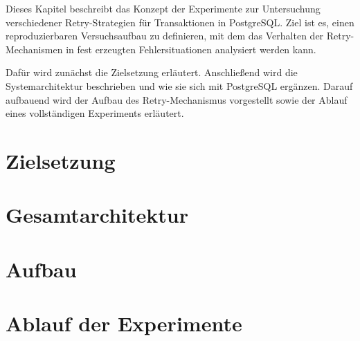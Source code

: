 
Dieses Kapitel beschreibt das Konzept der Experimente zur Untersuchung verschiedener Retry-Strategien für
Transaktionen in PostgreSQL\@.
Ziel ist es, einen reproduzierbaren Versuchsaufbau zu definieren, mit dem das Verhalten der Retry-Mechanismen in
fest erzeugten Fehlersituationen analysiert werden kann.

Dafür wird zunächst die Zielsetzung erläutert.
Anschließend wird die Systemarchitektur beschrieben und wie sie sich mit PostgreSQL ergänzen.
Darauf aufbauend wird der Aufbau des Retry-Mechanismus vorgestellt sowie der Ablauf eines vollständigen
Experiments erläutert.

\section{Zielsetzung}
\label{sec:purpose}


\section{Gesamtarchitektur}
\label{sec:architecture}


\section{Aufbau}
\label{sec:design}


\section{Ablauf der Experimente}
\label{sec:process}
